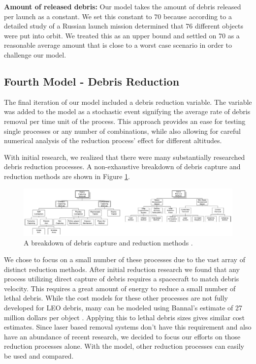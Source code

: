 \documentclass[pre,12pt]{revtex4-1}
\begin{document}
\textbf{Amount of released debris: }Our model takes the amount of debris released per launch as a constant. We set this constant to $70$ because according to \cite{orbitalDebris} a detailed study of a Russian launch mission determined that $76$ different objects were put into orbit. We treated this as an upper bound and settled on 70 as a reasonable average amount that is close to a worst case scenario in order to challenge our model. \\

\subsection{Fourth Model - Debris Reduction}

The final iteration of our model included a debris reduction variable. The variable was added to the model as a stochastic event signifying the average rate of debris removal per time unit of the process. This approach provides an ease for testing single processes or any number of combinations, while also allowing for careful numerical analysis of the reduction process' effect for different altitudes.

With initial research, we realized that there were many substantially researched debris reduction processes. A non-exhaustive breakdown of debris capture and reduction methods are shown in Figure \ref{fig:ReductionMethods}.

\begin{figure}[h!]
	\includegraphics[width=1\textwidth]{"Figures/ReductionMethods"}
	\caption{A breakdown of debris capture and reduction methods \citep{ReductionMethods}.}
	\label{fig:ReductionMethods}
\end{figure}


We chose to focus on a small number of these processes due to the vast array of distinct reduction methods. After initial reduction research we found that any process utilizing direct capture of debris requires a spacecraft to match debris velocity. This requires a great amount of energy to reduce a small number of lethal debris. While the cost models for these other processes are not fully developed for LEO debris, many can be modeled using Bannal's estimate of 27 million dollars per object \citep{PhippsRemovingDebris}. Applying this to lethal debris sizes gives similar cost estimates. Since laser based removal systems don't have this requirement and also have an abundance of recent research, we decided to focus our efforts on those reduction processes alone. With the model, other reduction processes can easily be used and compared.
\end{document}
